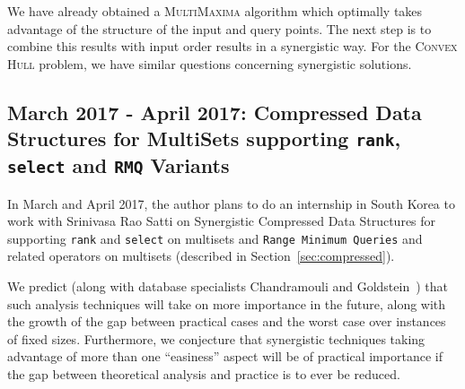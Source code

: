 We have already obtained a \textsc{MultiMaxima} algorithm which
optimally takes advantage of the structure of the input and query
points. The next step is to combine this results with input order
results in a synergistic way.
For the \textsc{Convex Hull} problem, we have similar questions
concerning synergistic solutions.

\subsection{March 2017 - April 2017: Compressed Data Structures for
  MultiSets supporting \texttt{rank}, \texttt{select} and \texttt{RMQ}
  Variants}

In March and April 2017, the author plans to do an internship in South
Korea to work with Srinivasa Rao Satti on Synergistic Compressed Data
Structures for supporting \texttt{rank} and \texttt{select} on
multisets and \texttt{Range Minimum Queries} and related operators on
multisets (described in Section~\ref{sec:compressed}).

We predict (along with database specialists Chandramouli and
Goldstein~\cite{2014-SIGMOD-PatienceIsAVirtueRevisitingMergeAndSortOnModernProcessors-ChandramouliGoldstein}) that such analysis techniques will take on more importance in the
future, along with the growth of the gap between practical cases and
the worst case over instances of fixed sizes. Furthermore, we
conjecture that synergistic techniques taking advantage of more than
one ``easiness'' aspect will be of practical importance if the gap
between theoretical analysis and practice is to ever be reduced.

\newpage

